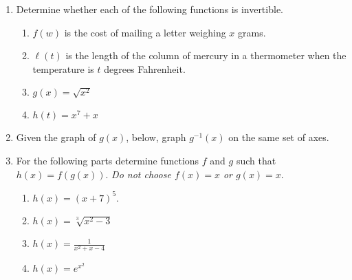 \documentclass[11pt]{article}
\begin{document}
\begin{enumerate}
\item Determine whether each of the following functions is invertible.
  \begin{enumerate}
  \item $f(w)$ is the cost of mailing a letter weighing $x$ grams.
    \vfill
  \item $\ell(t)$ is the length of the column of mercury in a
    thermometer when the temperature is $t$ degrees Fahrenheit.
    \vfill
  \item $g(x) = \sqrt{x^2}$
    \vfill
  \item $h(t) = x^7 + x$
    \vfill
  \end{enumerate}

  \newpage
  
\item Given the graph of $g(x)$, below, graph $g^{-1}(x)$ on the same
  set of axes.
  \begin{center}
  \end{center}

\item For the following parts determine functions $f$ and $g$ such
  that $h(x)=f(g(x))$. \emph{Do not choose $f(x)=x$ or $g(x)=x$}.
  \begin{multicols*}{2}
    \begin{enumerate}
    \item $h(x) = (x+7)^5$.
      \vfill
    \item $h(x) = \sqrt[3]{x^2-3}$
      \vfill
      \columnbreak
    \item $h(x) = \frac{1}{x^2+x-4}$
      \vfill
    \item $h(x) = e^{x^2}$
    \end{enumerate}
  \end{multicols*}

\end{enumerate}
\end{document}
